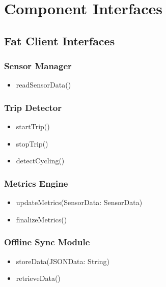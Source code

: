 \documentclass{Configuration_Files/PoliMi3i_thesis}
\begin{document}
\section{Component Interfaces}

\subsection{Fat Client Interfaces}
\subsubsection{Sensor Manager}
\begin{itemize}
    \item readSensorData()
\end{itemize}

\subsubsection{Trip Detector}
\begin{itemize}
    \item startTrip()
    \item stopTrip()
    \item detectCycling()
\end{itemize}

\subsubsection{Metrics Engine}
\begin{itemize}
    \item updateMetrics(SensorData: SensorData)
    \item finalizeMetrics()
\end{itemize}


\subsubsection{Offline Sync Module}
\begin{itemize}
    \item storeData(JSONData: String)
    \item retrieveData()
\end{itemize}
\end{document}
